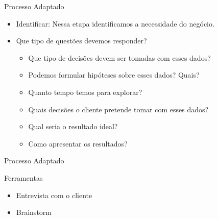\begin{frame}
	\begin{block}{Processo Adaptado}
		\begin{itemize}

		\item Identificar: Nessa etapa identificamos a necessidade do negócio. 
		\item Que tipo de questões devemos responder?
		\begin{itemize}
			\item Que tipo de decisões devem ser tomadas com esses dados?
			\item Podemos formular hipóteses sobre esses dados? Quais?
			\item Quanto tempo temos para explorar?
			\item Quais decisões o cliente pretende tomar com esses dados?
			\item Qual seria o resultado ideal?
			\item Como apresentar os resultados?
		\end{itemize}		
			
		\end{itemize}								
	\end{block}
\end{frame}


\begin{frame}
	\begin{block}{Processo Adaptado}
	
		Ferramentas
		\begin{itemize}

			\item Entrevista com o cliente
			\item Brainstorm
			
		\end{itemize}								
	\end{block}
\end{frame}



